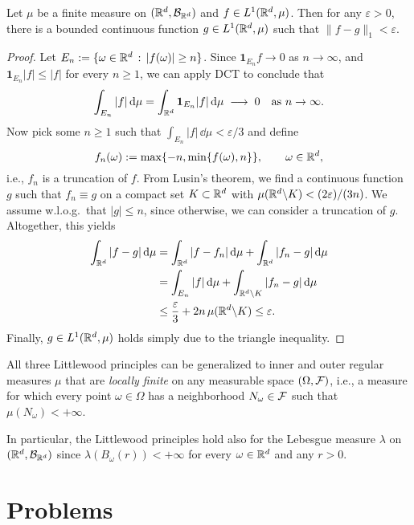 \begin{theorem}[Approximation in $L^1$]\label{thm:L1-approximation}
	Let $\mu$ be a finite measure on $(\mathbb R^d,\mathcal B_{\mathbb R^d})$ and $f\in L^1(\mathbb R^d,\mu)$. Then for any $\varepsilon>0$, there is a bounded continuous function $g\in L^1(\mathbb R^d,\mu)$ such that $\|f-g\|_1<\varepsilon$.
\end{theorem}
\begin{proof}
	Let $E_n:=\{\omega\in\mathbb R^d\,:\, |f(\omega)|\ge n\}$. Since $\mathbf{1}_{E_n}f \to 0$ as $n\to\infty$, and $\mathbf{1}_{E_n}|f|\le |f|$ for every $n\ge 1$, we can apply DCT to conclude that
	\[
		\int_{E_n} |f|\,\mathrm{d}\mu = \int_{\mathbb R^d} \mathbf{1}_{E_n}|f|\,\mathrm{d}\mu\;\longrightarrow\;0\quad\text{as $n\to\infty$}.
	\]
	Now pick some $n\ge 1$ such that $\int_{E_n} |f|\,\dd\mu <\varepsilon/3$ and define
	\[
		f_n(\omega):= \max\{-n,\min\{f(\omega),n\}\}, \qquad\omega\in\mathbb R^d,
	\]
	i.e., $f_n$ is a truncation of $f$. From Lusin's theorem, we find a continuous function $g$ such that $f_n\equiv g$ on a compact set $K\subset\mathbb R^d$ with $\mu(\mathbb R^d\backslash K)<(2\varepsilon)/(3n)$. We assume w.l.o.g.\ that $|g|\le n$, since otherwise, we can consider a truncation of $g$. Altogether, this yields
	\begin{align*}
		\int_{\mathbb R^d} |f-g|\,\mathrm{d}\mu &= \int_{\mathbb R^d} |f-f_n|\,\mathrm{d}\mu + \int_{\mathbb R^d} |f_n-g|\,\mathrm{d}\mu \\
		&= \int_{E_n} |f|\,\mathrm{d}\mu + \int_{\mathbb R^d\backslash K} |f_n-g|\,\mathrm{d}\mu \\
		&\le \frac{\varepsilon}{3} + 2n\,\mu(\mathbb R^d\backslash K) \le  \varepsilon.
	\end{align*}
	Finally, $g\in L^1(\mathbb R^d,\mu)$ holds simply due to the triangle inequality.
\end{proof}

\begin{remark}
	All three Littlewood principles can be generalized to inner and outer regular measures $\mu$ that are \emph{locally finite} on any measurable space $(\Omega,\mathcal F)$, i.e., a measure for which every point $\omega\in\Omega$ has a neighborhood $N_\omega\in\mathcal F$ such that $\mu(N_\omega)<+\infty$. 
	
	In particular, the Littlewood principles hold also for the Lebesgue measure $\lambda$ on $(\mathbb R^d,\mathcal B_{\mathbb R^d})$ since $\lambda(B_\omega(r))<+\infty$ for every $\omega\in\mathbb R^d$ and any $r>0$.
\end{remark}

\section{Problems}

